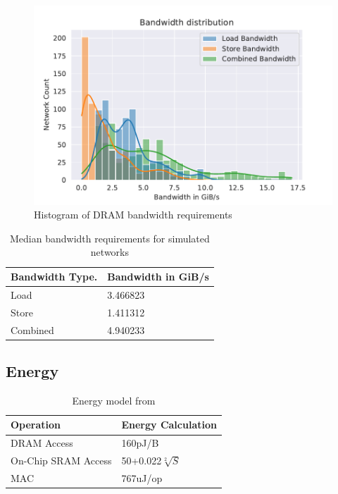 \begin{figure}[ht]
    \centering
    \includegraphics[scale=0.58]{Plots/resources/net_bw.pdf}
    \caption{Histogram of DRAM bandwidth requirements }
    \label{fig:dram_bw}
\end{figure}

\begin{table}[]
    \center
    \begin{tabular}{|l|l|}
    \toprule
    Bandwidth Type. & Bandwidth in GiB/s    \\ 
    \midrule
    Load            & 3.466823  \\ \hline
    Store          & 1.411312  \\ \hline
    Combined          & 4.940233   \\ \hline
\end{tabular}
\caption{Median bandwidth requirements for simulated networks}
\label{tab:median_dram_bw}
\end{table}

\subsection{Energy}
\label{chap:hero:results:energy}

\begin{table}[]
    \center
    \begin{tabular}{|l|l|}
    \toprule
    Operation & Energy Calculation    \\ 
    \midrule
    DRAM Access                 & 160pJ/B  \\ \hline
    On-Chip SRAM Access         & 50+0.022$\sqrt[2]{S}$  \\ \hline
    MAC                         & 767uJ/op  \\ \hline
\end{tabular}
\caption{Energy model from \cite{area_model}}
\label{tab:energy_model}
\end{table}

